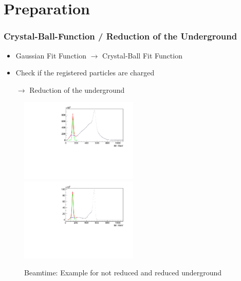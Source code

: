 \documentclass[slidestop,compress,mathserif]{beamer}
\begin{document}
\section{Preparation}
\begin{frame}
	\frametitle{Crystal-Ball-Function / Reduction of the Underground}
	\begin{itemize}
		\item Gaussian Fit Function $\rightarrow$ Crystal-Ball Fit Function
		\pause
		\item Check if the registered particles are charged 
		
		$\rightarrow$ Reduction of the underground
	\end{itemize}

\pause
\begin{figure}
	
		\includegraphics[width=0.50\textwidth]{Pictures/20171904RealIntervalFitExample}
	\hfill
		\includegraphics[width=0.50\textwidth]{Pictures/20171904RealUnchargedFitExample}
		\caption{Beamtime: Example for not reduced and reduced underground}
\end{figure}

\end{frame}
\end{document}
